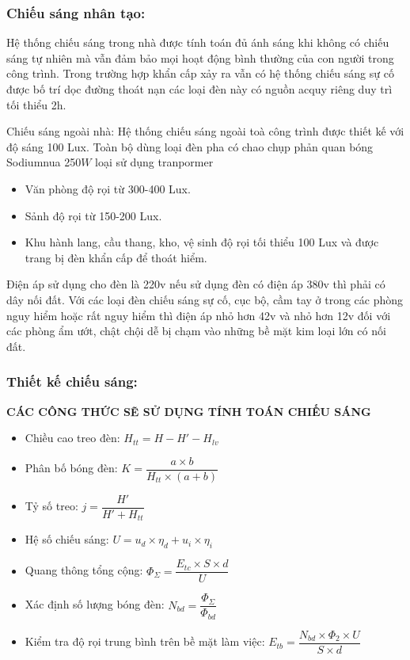 \subsubsection{Chiếu sáng nhân tạo:}
Hệ thống chiếu sáng trong nhà được tính toán đủ ánh sáng khi không có chiếu sáng tự nhiên mà vẫn đảm bảo mọi hoạt động bình thường của con người trong công trình. Trong trường hợp khẩn cấp xảy ra vẫn có hệ thống chiếu sáng sự cố được bố trí dọc đường thoát nạn các loại đèn này có nguồn acquy riêng duy trì tối thiểu 2h.

Chiếu sáng ngoài nhà: Hệ thống chiếu sáng ngoài toà công trình được thiết kế với độ sáng 100 Lux. Toàn bộ dùng loại đèn pha có chao chụp phản quan bóng Sodiumnua 250$ W $ loại sử dụng tranpormer
\begin{itemize}
	\item Văn phòng độ rọi từ 300-400 Lux.
	\item Sảnh độ rọi từ 150-200 Lux.
	\item Khu hành lang, cầu thang, kho, vệ sinh độ rọi tối thiểu 100 Lux và được trang bị đèn khẩn cấp để thoát hiểm.
\end{itemize}

Điện áp sử dụng cho đèn là 220v nếu sử dụng đèn có điện áp 380v thì phải có dây nối đất. Với các loại đèn chiếu sáng sự cố, cục bộ, cầm tay ở trong các phòng nguy hiểm hoặc rất nguy hiểm thì điện áp nhỏ hơn 42v và nhỏ hơn 12v đối với các phòng ẩm ướt, chật chội dễ bị chạm vào những bề mặt kim loại lớn có nối đất.
\subsubsection{Thiết kế chiếu sáng:}
\textbf{CÁC CÔNG THỨC SẼ SỬ DỤNG TÍNH TOÁN CHIẾU SÁNG}
\begin{itemize}[label = $\blacktriangleright$]
	\item Chiều cao treo đèn: $H_{tt} = H - H' - H_{lv}$
	\item Phân bố bóng đèn: $K = \dfrac{a\times b}{H_{tt}\times (a+b)}$
	\item Tỷ số treo: $j =\dfrac{H'}{H' + H_{tt}}$
	\item Hệ số chiếu sáng: $U = u_{d}\times \eta_{d} + u_{i}\times \eta_{i}$
	\item Quang thông tổng cộng: {\Large $\Phi$}$_{\Sigma} = \dfrac{E_{tc}\times S\times d}{U}$
	\item Xác định số lượng bóng đèn: $N_{bd} = ${\Large $\dfrac{\Phi_{\Sigma}}{\Phi_{bd}}$}
	\item Kiểm tra độ rọi trung bình trên bề mặt làm việc: $E_{tb} = \dfrac{N_{bd}\times \Phi_{2}\times U}{S\times d}$
\end{itemize}





